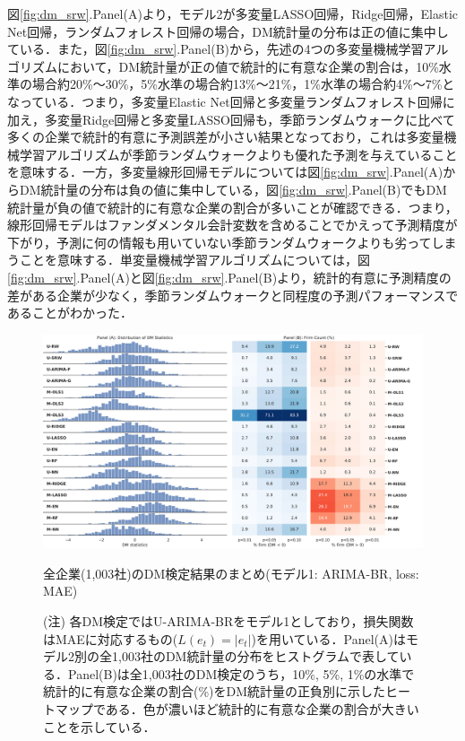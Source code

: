 \documentclass[a4paper，12pt]{jsarticle}
\begin{document}
図\ref{fig:dm_srw}.Panel(A)より，モデル2が多変量LASSO回帰，Ridge回帰，Elastic Net回帰，ランダムフォレスト回帰の場合，DM統計量の分布は正の値に集中している．また，図\ref{fig:dm_srw}.Panel(B)から，先述の4つの多変量機械学習アルゴリズムにおいて，DM統計量が正の値で統計的に有意な企業の割合は，10\%水準の場合約20\%～30\%，5\%水準の場合約13\%～21\%，1\%水準の場合約4\%～7\%となっている．つまり，多変量Elastic Net回帰と多変量ランダムフォレスト回帰に加え，多変量Ridge回帰と多変量LASSO回帰も，季節ランダムウォークに比べて多くの企業で統計的有意に予測誤差が小さい結果となっており，これは多変量機械学習アルゴリズムが季節ランダムウォークよりも優れた予測を与えていることを意味する．一方，多変量線形回帰モデルについては図\ref{fig:dm_srw}.Panel(A)からDM統計量の分布は負の値に集中している，図\ref{fig:dm_srw}.Panel(B)でもDM統計量が負の値で統計的に有意な企業の割合が多いことが確認できる．つまり，線形回帰モデルはファンダメンタル会計変数を含めることでかえって予測精度が下がり，予測に何の情報も用いていない季節ランダムウォークよりも劣ってしまうことを意味する．単変量機械学習アルゴリズムについては，図\ref{fig:dm_srw}.Panel(A)と図\ref{fig:dm_srw}.Panel(B)より，統計的有意に予測精度の差がある企業が少なく，季節ランダムウォークと同程度の予測パフォーマンスであることがわかった．

\begin{figure}[htbp]
  \centering
  \includegraphics[width=15cm]{./img/_dm_MAD_y_hat_sarima_br.pdf}
  \caption{全企業(1,003社)のDM検定結果のまとめ(モデル1: ARIMA-BR, loss: MAE)}
  \label{fig:dm_sarima_br}
  \caption*{(注) 各DM検定ではU-ARIMA-BRをモデル1としており，損失関数はMAEに対応するもの($L(e_t)=|e_t|$)を用いている．Panel(A)はモデル2別の全1,003社のDM統計量の分布をヒストグラムで表している．Panel(B)は全1,003社のDM検定のうち，10\%, 5\%, 1\%の水準で統計的に有意な企業の割合(\%)をDM統計量の正負別に示したヒートマップである．色が濃いほど統計的に有意な企業の割合が大きいことを示している．}
\end{figure}
\end{document}
